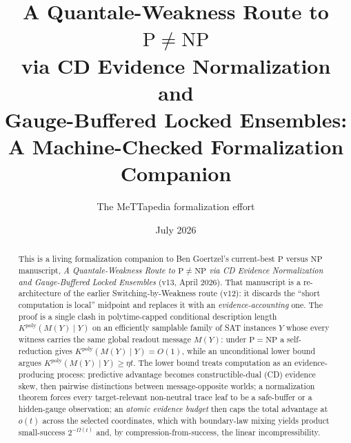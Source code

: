 \documentclass[11pt]{article}
\title{A Quantale-Weakness Route to $\mathrm{P}\neq\mathrm{NP}$\\
via CD Evidence Normalization and\\
Gauge-Buffered Locked Ensembles:\\
\large A Machine-Checked Formalization Companion}
\author{The MeTTapedia formalization effort}
\date{July 2026}
\theoremstyle{definition}
\newcommand{\Kpoly}{K^{\mathrm{poly}}}
\newcommand{\MY}{M(Y)}
\begin{document}
\maketitle
\sloppy

\begin{abstract}
This is a living formalization companion to Ben Goertzel's current-best
$\mathrm{P}$ versus $\mathrm{NP}$ manuscript, \emph{A Quantale-Weakness Route to
$\mathrm{P}\neq\mathrm{NP}$ via CD Evidence Normalization and Gauge-Buffered
Locked Ensembles} (v13, April 2026). That manuscript is a re-architecture of the
earlier Switching-by-Weakness route (v12): it discards the ``short computation is
local'' midpoint and replaces it with an \emph{evidence-accounting} one. The
proof is a single clash in polytime-capped conditional description length
$\Kpoly(\MY\mid Y)$ on an efficiently samplable family of SAT instances $Y$ whose
every witness carries the same global readout message $\MY$: under
$\mathrm{P}=\mathrm{NP}$ a self-reduction gives $\Kpoly(\MY\mid Y)=O(1)$, while an
unconditional lower bound argues $\Kpoly(\MY\mid Y)\ge\eta t$. The lower bound
treats computation as an evidence-producing process: predictive advantage becomes
constructible-dual (CD) evidence skew, then pairwise distinctions between
message-opposite worlds; a normalization theorem forces every target-relevant
non-neutral trace leaf to be a safe-buffer or a hidden-gauge observation; an
\emph{atomic evidence budget} then caps the total advantage at $o(t)$ across the
selected coordinates, which with boundary-law mixing yields product small-success
$2^{-\Omega(t)}$ and, by compression-from-success, the linear incompressibility.


\end{abstract}
\end{document}
